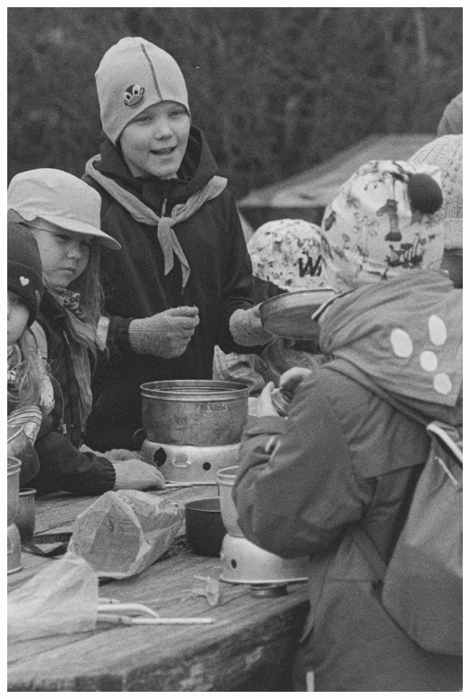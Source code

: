 \documentclass[10pt,finnish,a5paper,headings=small,twoside=semi]{scrartcl}
\begin{document}
\begin{multicols}{2}

	\vspace*{0.16cm}
	\noindent\includegraphics[width=\linewidth]{assets/kolkkienpäiväretkibw2}

	\columnbreak


\end{multicols}
\end{document}
